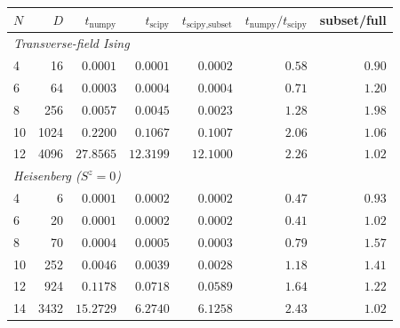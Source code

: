 \begin{tabular}{lrrrrrr}
\toprule
$N$ & $D$ & $t_{\text{numpy}}$ & $t_{\text{scipy}}$ & $t_{\text{scipy,subset}}$ & $t_{\text{numpy}}/t_{\text{scipy}}$ & subset/full \\
\midrule
\multicolumn{7}{l}{\textit{Transverse-field Ising}} \\
4 & 16 & $0.0001$ & $0.0001$ & $0.0002$ & $0.58$ & $0.90$ \\
6 & 64 & $0.0003$ & $0.0004$ & $0.0004$ & $0.71$ & $1.20$ \\
8 & 256 & $0.0057$ & $0.0045$ & $0.0023$ & $1.28$ & $1.98$ \\
10 & 1024 & $0.2200$ & $0.1067$ & $0.1007$ & $2.06$ & $1.06$ \\
12 & 4096 & $27.8565$ & $12.3199$ & $12.1000$ & $2.26$ & $1.02$ \\
\multicolumn{7}{l}{\textit{Heisenberg ($S^z=0$)}} \\
4 & 6 & $0.0001$ & $0.0002$ & $0.0002$ & $0.47$ & $0.93$ \\
6 & 20 & $0.0001$ & $0.0002$ & $0.0002$ & $0.41$ & $1.02$ \\
8 & 70 & $0.0004$ & $0.0005$ & $0.0003$ & $0.79$ & $1.57$ \\
10 & 252 & $0.0046$ & $0.0039$ & $0.0028$ & $1.18$ & $1.41$ \\
12 & 924 & $0.1178$ & $0.0718$ & $0.0589$ & $1.64$ & $1.22$ \\
14 & 3432 & $15.2729$ & $6.2740$ & $6.1258$ & $2.43$ & $1.02$ \\
\bottomrule
\end{tabular}
